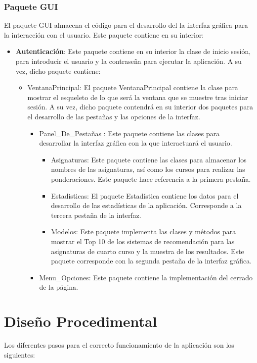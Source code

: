 \subsubsection{Paquete GUI}
El paquete GUI almacena el código para el desarrollo del la interfaz gráfica para la interacción con el usuario. Este paquete contiene en su interior: 
\begin{itemize}
\item \textbf{Autenticación}: Este paquete contiene en su interior la clase de inicio sesión, para introducir el usuario y la contraseña para ejecutar la aplicación. A su vez, dicho paquete contiene: 
\begin{itemize}
\item VentanaPrincipal: El paquete VentanaPrincipal contiene la clase para mostrar el esqueleto de lo que será la ventana que se muestre tras iniciar sesión. A su vez, dicho paquete contendrá en su interior dos paquetes para el desarrollo de  las pestañas y las opciones de la interfaz. 
\begin{itemize}
\item Panel\_De\_Pestañas : Este paquete contiene las clases para desarrollar la interfaz gráfica con la que interactuará el usuario. 
\begin{itemize}
\item Asignaturas: Este paquete contiene las clases para almacenar los nombres de las asignaturas, así como los cursos para realizar las ponderaciones. Este paquete hace referencia a la primera pestaña.   
\item Estadisticas: El paquete Estadística contiene los datos para el desarrollo de las estadísticas de la aplicación. Corresponde a la tercera pestaña de la interfaz. 
\item Modelos: Este paquete implementa las clases y métodos para mostrar el Top 10 de los sistemas de recomendación para las asignaturas de cuarto curso y la muestra de los resultados. Este paquete corresponde con la segunda pestaña de la interfaz gráfica. 
\end{itemize}

\item Menu\_Opciones: Este paquete contiene la implementación del cerrado de la página. 
\end{itemize}
\end{itemize}
\end{itemize}
\section{Diseño Procedimental}
Los diferentes pasos para el correcto funcionamiento de la aplicación son los siguientes: 

